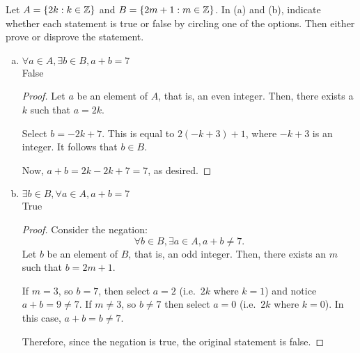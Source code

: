 \question Let $A = \{2k : k\in\mathbb{Z}\}$ and $B = \{2m + 1 : m\in\mathbb{Z}\}$.
In (a) and (b), indicate whether each statement is true or false by circling one of the options.
Then either prove or disprove the statement.
\begin{enumerate}[(a)]
  \item $\forall a \in A, \exists b \in B, a + b = 7$ \\
         \quad False
        \begin{proof}
          Let $a$ be an element of $A$, that is, an even integer.
          Then, there exists a $k$ such that $a=2k$.

          Select $b = -2k + 7$.
          This is equal to $2(-k+3)+1$, where $-k+3$ is an integer.
          It follows that $b \in B$.

          Now, $a + b = 2k - 2k + 7 = 7$, as desired.
        \end{proof}
  \item $\exists b \in B, \forall a \in A, a + b = 7$ \\
        True \quad {}
        \begin{proof}
          Consider the negation:
          \[ \forall b \in B, \exists a \in A, a + b \neq 7. \]
          Let $b$ be an element of $B$, that is, an odd integer.
          Then, there exists an $m$ such that $b=2m+1$.

          If $m=3$, so $b=7$, then select $a=2$ (i.e.\ $2k$ where $k=1$) and notice $a+b=9 \neq 7$.
          If $m\neq 3$, so $b\neq 7$ then select $a=0$ (i.e.\ $2k$ where $k=0$).
          In this case, $a+b = b \neq 7$.

          Therefore, since the negation is true, the original statement is false.
        \end{proof}
\end{enumerate}


